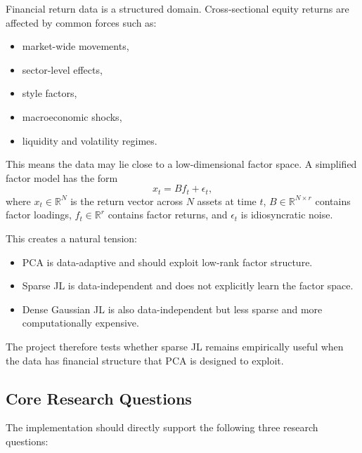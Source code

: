 \documentclass[11pt]{article}
\begin{document}
Financial return data is a structured domain. Cross-sectional equity returns are affected by common forces such as:

\begin{itemize}
    \item market-wide movements,
    \item sector-level effects,
    \item style factors,
    \item macroeconomic shocks,
    \item liquidity and volatility regimes.
\end{itemize}

This means the data may lie close to a low-dimensional factor space. A simplified factor model has the form
\[
x_t = B f_t + \epsilon_t,
\]
where $x_t \in \mathbb{R}^N$ is the return vector across $N$ assets at time $t$, $B \in \mathbb{R}^{N \times r}$ contains factor loadings, $f_t \in \mathbb{R}^r$ contains factor returns, and $\epsilon_t$ is idiosyncratic noise.

This creates a natural tension:

\begin{itemize}
    \item PCA is data-adaptive and should exploit low-rank factor structure.
    \item Sparse JL is data-independent and does not explicitly learn the factor space.
    \item Dense Gaussian JL is also data-independent but less sparse and more computationally expensive.
\end{itemize}

The project therefore tests whether sparse JL remains empirically useful when the data has financial structure that PCA is designed to exploit.

\subsection{Core Research Questions}

The implementation should directly support the following three research questions:
\end{document}
